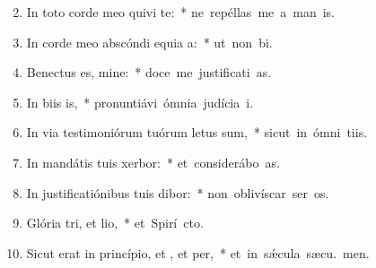 \begin{flushleft}
\begin{enumerate}[leftmargin=*]
\setcounter{enumi}{1}

\item In toto corde meo quivi te:~* \mbox{ne repéllas me a man is.}
\item In corde meo abscóndi equia a:~* \mbox{ut non  bi.}
\item Benectus es, mine:~* \mbox{doce me justificati as.}
\item In biis is,~* \mbox{pronuntiávi ómnia judícia  i.}
\item In via testimoniórum tuórum letus sum,~* \mbox{sicut in ómni tiis.}
\item In mandátis tuis xerbor:~* \mbox{et considerábo  as.}
\item In justificatiónibus tuis dibor:~* \mbox{non oblivíscar ser os.}
\item Glória tri, et lio,~* \mbox{et Spirí cto.}
\item Sicut erat in princípio, et , et per,~* \mbox{et in s\'{\ae}cula sæcu. men.}


\end{enumerate}
\end{flushleft}

